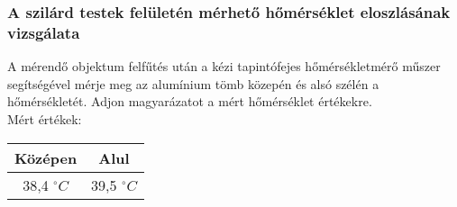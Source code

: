\documentclass[10pt,a4paper]{article}
\begin{document}
\subsubsection{A szilárd testek felületén mérhető hőmérséklet eloszlásának vizsgálata}
A mérendő objektum felfűtés után a kézi tapintófejes
hőmérsékletmérő műszer segítségével mérje meg az alumínium
tömb közepén és alsó szélén a hőmérsékletét.
Adjon magyarázatot a mért hőmérséklet értékekre.$$$$Mért értékek:$$$$\begin{tabular}{|c|c|}
\hline 
Középen & Alul \\ 
\hline 
38,4 $^{\circ}C$ & 39,5 $^{\circ}C$  \\ 
\hline 
\end{tabular} 
\tableofcontents
\end{document}
